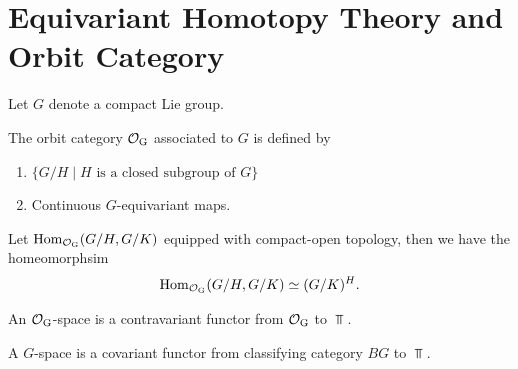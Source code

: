
\chapter{Equivariant Homotopy Theory and Orbit Category}

Let $G$ denote a compact Lie group. 

\begin{definition}
    The orbit category $\operatorname{\mathcal{O}_G}$ associated to $G$ is defined by 
    \begin{enumerate}
        \item[Objects] $\{G/H\mid H\text{ is a closed subgroup of }G\}$
        \item[Morphsims] Continuous $G$-equivariant maps. 
    \end{enumerate}
\end{definition}

Let $\operatorname{Hom}_{\operatorname{\mathcal{O}_G}}(G/H,G/K)$ equipped with compact-open topology, then we have the homeomorphsim 
\begin{align*}
    \operatorname{Hom}_{\operatorname{\mathcal{O}_G}}(G/H,G/K) \simeq (G/K)^H.
\end{align*} 




\begin{definition}
    An $\operatorname{\mathcal{O}_G}$-space is a contravariant functor from $\operatorname{\mathcal{O}_G}$ to $\Top$.
\end{definition}

\begin{definition}
    A $G$-space is a covariant functor from classifying category $BG$ to $\Top$.
\end{definition}

\begin{theorem}
    
\end{theorem}





